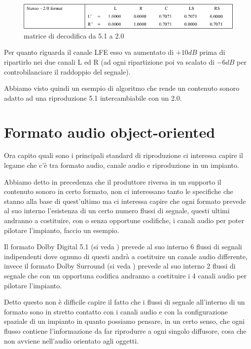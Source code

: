 \documentclass[12pt,a4paper]{report}
\begin{document}
\begin{figure}[htbp]
	\centering
	\includegraphics[scale=0.5]{figures/5-1to2-0.png}
	\caption {matrice di decodifica da 5.1 a 2.0}
	\label{fig:decodifica}
	\end{figure}

Per quanto riguarda il canale LFE esso va aumentato di $+10dB$ prima di ripartirlo nei due canali L ed R (ad ogni ripartizione poi va scalato di $-6dB$ per controbilanciare il raddoppio del segnale).

Abbiamo visto quindi un esempio di algoritmo che rende un contenuto sonoro adatto ad una riproduzione 5.1 intercambiabile con un 2.0.

\section{Formato audio object-oriented}

Ora capito quali sono i principali standard di riproduzione ci interessa capire il legame che c'è tra formato audio, canale audio e riproduzione in un impianto. 

Abbiamo detto in precedenza che il produttore riversa in un supporto il contenuto sonoro in certo formato, non ci interessano tanto le specifiche che stanno alla base di quest'ultimo ma ci interessa capire che ogni formato prevede al suo interno l'esistenza di un certo numero flussi di segnale, questi ultimi andranno a costituire, con o senza opportune codifiche, i canali audio per poter pilotare l'impianto, faccio un esempio.

Il formato Dolby Digital 5.1 (si veda \cite{digital}) prevede al suo interno 6 flussi di segnali indipendenti dove ognuno di questi andrà a costituire un canale audio differente, invece il formato Dolby Surround (si veda \cite{surround}) prevede al suo interno 2 flussi di segnale che con un opportuna codifica andranno a costituire i 4 canali audio per pilotare l'impianto. 

Detto questo non è difficile capire il fatto che i flussi di segnale all'interno di un formato sono in stretto contatto con i canali audio e con la configurazione spaziale di un impianto in quanto possiamo pensare, in un certo senso, che ogni flusso contiene l'informazione da far riprodurre a ogni singolo diffusore, cosa che non avviene nell'audio orientato agli oggetti.
\end{document}
